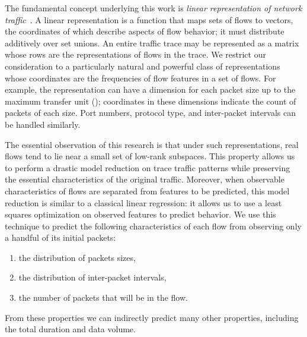 \documentclass[conference]{IEEEtran}
\begin{document}
The fundamental concept underlying this work is \emph{linear representation of network traffic}~\cite{Karpinski08}.
A linear representation is a function that maps sets of flows to vectors, the coordinates of which describe aspects of flow behavior;
it must distribute additively over set unions.
An entire traffic trace may be represented as a matrix whose rows are the representations of flows in the trace.
We restrict our consideration to a particularly natural and powerful class of representations whose coordinates are the frequencies of flow features in a set of flows.
For example, the representation can have a dimension for each packet size up to the maximum transfer unit ();
coordinates in these dimensions indicate the count of packets of each size.
Port numbers,  protocol type, and inter-packet intervals can be handled similarly.

The essential observation of this research is that under such representations, real flows tend to lie near a small set of low-rank subspaces.
This property allows us to perform a drastic model reduction on trace traffic patterns while preserving the essential characteristics of the original traffic.
Moreover, when observable characteristics of flows are separated from features to be predicted, this model reduction is similar to a classical linear regression:
it allows us to use a least squares optimization on observed features to predict behavior.
We use this technique to predict the following characteristics of each flow from observing only a handful of its initial packets:
\begin{enumerate}
  \item the distribution of packets sizes,
  \item the distribution of inter-packet intervals,
  \item the number of packets that will be in the flow.
\end{enumerate}
From these properties we can indirectly predict many other properties, including the total duration and data volume.
\end{document}

